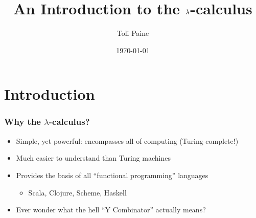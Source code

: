 \documentclass{beamer}
\title{An Introduction to the $\l$-calculus}
\author{Toli Paine}
\institute{Quantcast}
\date{\monthyear\today}
\renewcommand{\l}{\lambda} %
\begin{document}
    \frame{\titlepage}

    \section{Introduction}
    \begin{frame}
        \frametitle{Why the $\l$-calculus?}
        \pause
        \begin{itemize}[<+->]
            \setlength{\itemsep}{1.5em}
            \item Simple, yet powerful: encompasses all of computing
                (Turing-complete!)
            \item Much easier to understand than Turing machines
            \item Provides the basis of all ``functional programming''
                languages \\[0.25em]
                \begin{itemize}[<+->]
                    \item Scala, Clojure, Scheme, Haskell
                \end{itemize}
                \vspace{-0.5em}
            \item Ever wonder what the hell ``Y Combinator'' actually means?
        \end{itemize}
    \end{frame}
\end{document}
